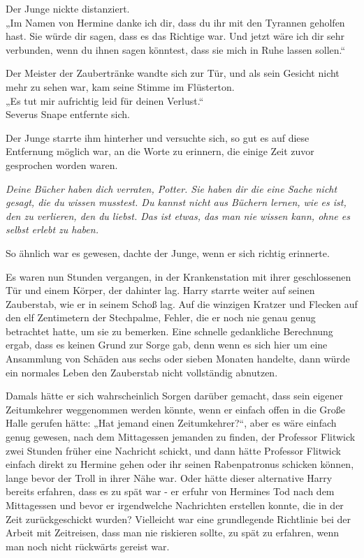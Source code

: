 {Der Junge nickte distanziert.\\ „Im Namen von Hermine danke ich dir, dass du ihr mit den Tyrannen geholfen hast. Sie würde dir sagen, dass es das Richtige war. Und jetzt wäre ich dir sehr verbunden, wenn du ihnen sagen könntest, dass sie mich in Ruhe lassen sollen.“

Der Meister der Zaubertränke wandte sich zur Tür, und als sein Gesicht nicht mehr zu sehen war, kam seine Stimme im Flüsterton.\\ „Es tut mir aufrichtig leid für deinen Verlust.“\\ Severus Snape entfernte sich.

Der Junge starrte ihm hinterher und versuchte sich, so gut es auf diese Entfernung möglich war, an die Worte zu erinnern, die einige Zeit zuvor gesprochen worden waren.

\emph{Deine Bücher haben dich verraten, Potter. Sie haben dir die eine Sache nicht gesagt, die du wissen musstest. Du kannst nicht aus Büchern lernen, wie es ist, den zu verlieren, den du liebst. Das ist etwas, das man nie wissen kann, ohne es selbst erlebt zu haben.}

So ähnlich war es gewesen, dachte der Junge, wenn er sich richtig erinnerte.

Es waren nun Stunden vergangen, in der Krankenstation mit ihrer geschlossenen Tür und einem Körper, der dahinter lag. Harry starrte weiter auf seinen Zauberstab, wie er in seinem Schoß lag. Auf die winzigen Kratzer und Flecken auf den elf Zentimetern der Stechpalme, Fehler, die er noch nie genau genug betrachtet hatte, um sie zu bemerken. Eine schnelle gedankliche Berechnung ergab, dass es keinen Grund zur Sorge gab, denn wenn es sich hier um eine Ansammlung von Schäden aus sechs oder sieben Monaten handelte, dann würde ein normales Leben den Zauberstab nicht vollständig abnutzen.

Damals hätte er sich wahrscheinlich Sorgen darüber gemacht, dass sein eigener Zeitumkehrer weggenommen werden könnte, wenn er einfach offen in die Große Halle gerufen hätte: „Hat jemand einen Zeitumkehrer?“, aber es wäre einfach genug gewesen, nach dem Mittagessen jemanden zu finden, der Professor Flitwick zwei Stunden früher eine Nachricht schickt, und dann hätte Professor Flitwick einfach direkt zu Hermine gehen oder ihr seinen Rabenpatronus schicken können, lange bevor der Troll in ihrer Nähe war. Oder hätte dieser alternative Harry bereits erfahren, dass es zu spät war - er erfuhr von Hermines Tod nach dem Mittagessen und bevor er irgendwelche Nachrichten erstellen konnte, die in der Zeit zurückgeschickt wurden? Vielleicht war eine grundlegende Richtlinie bei der Arbeit mit Zeitreisen, dass man nie riskieren sollte, zu spät zu erfahren, wenn man noch nicht rückwärts gereist war.

}
